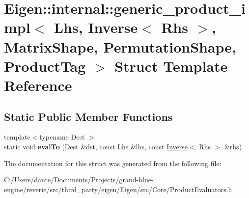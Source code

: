 \hypertarget{struct_eigen_1_1internal_1_1generic__product__impl_3_01_lhs_00_01_inverse_3_01_rhs_01_4_00_01_ma98d6fa405abbfe2d34bd4bd3f95df76a}{}\section{Eigen\+::internal\+::generic\+\_\+product\+\_\+impl$<$ Lhs, Inverse$<$ Rhs $>$, Matrix\+Shape, Permutation\+Shape, Product\+Tag $>$ Struct Template Reference}
\label{struct_eigen_1_1internal_1_1generic__product__impl_3_01_lhs_00_01_inverse_3_01_rhs_01_4_00_01_ma98d6fa405abbfe2d34bd4bd3f95df76a}
\subsection*{Static Public Member Functions}
\begin{DoxyCompactItemize}
\item 
\mbox{\label{struct_eigen_1_1internal_1_1generic__product__impl_3_01_lhs_00_01_inverse_3_01_rhs_01_4_00_01_ma98d6fa405abbfe2d34bd4bd3f95df76a_a15ae32a9b4f789bcac9b3a9ed10229f0}} 
{\footnotesize template$<$typename Dest $>$ }\\static void {\bfseries eval\+To} (Dest \&dst, const Lhs \&lhs, const \mbox{\hyperlink{class_eigen_1_1_inverse}{Inverse}}$<$ Rhs $>$ \&rhs)
\end{DoxyCompactItemize}


The documentation for this struct was generated from the following file\+:\begin{DoxyCompactItemize}
\item 
C\+:/\+Users/dante/\+Documents/\+Projects/grand-\/blue-\/engine/reverie/src/third\+\_\+party/eigen/\+Eigen/src/\+Core/Product\+Evaluators.\+h\end{DoxyCompactItemize}
